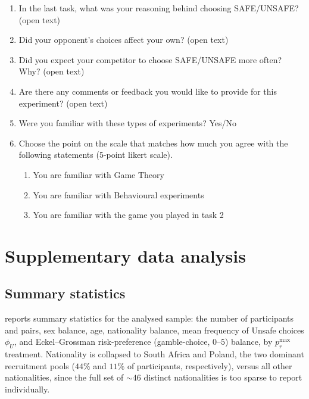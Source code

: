 \documentclass[pdflatex,sn-mathphys-ay]{sn-jnl}
\theoremstyle{thmstyleone}
\theoremstyle{thmstyletwo}
\theoremstyle{thmstylethree}
\begin{document}
\begin{enumerate}
    \item In the last task, what was your reasoning behind choosing SAFE/UNSAFE? (open text)
    \item Did your opponent's choices affect your own? (open text)
    \item Did you expect your competitor to choose SAFE/UNSAFE more often? Why? (open text)
    \item Are there any comments or feedback you would like to provide for this experiment? (open text)
    \item Were you familiar with these types of experiments? Yes/No
    \item Choose the point on the scale that matches how much you agree with the following statements (5-point likert scale).
    \begin{enumerate}
        \item You are familiar with Game Theory
        \item You are familiar with Behavioural experiments
        \item You are familiar with the game you played in task 2
    \end{enumerate}
\end{enumerate}

\section{Supplementary data analysis}
\label{si:sec:data-analysis}

\subsection{Summary statistics}
\label{si:sec:summary-stats}

 reports summary statistics for the analysed sample: the number of participants and pairs, sex balance, age, nationality balance, mean frequency of Unsafe choices \(\phi_U\), and Eckel--Grossman risk-preference (gamble-choice, \(0\)--\(5\)) balance, by \(p_r^{\max}\) treatment. Nationality is collapsed to South Africa and Poland, the two dominant recruitment pools (\(44\%\) and \(11\%\) of participants, respectively), versus all other nationalities, since the full set of \(\sim\!46\) distinct nationalities is too sparse to report individually.
\end{document}
